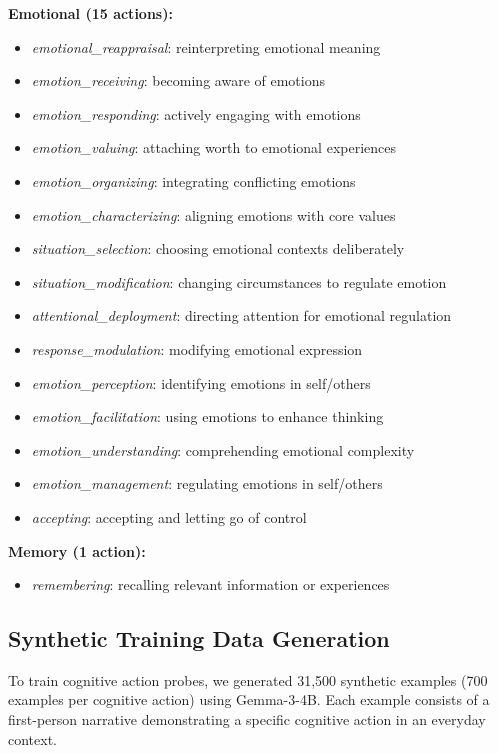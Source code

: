 \documentclass{article}
\begin{document}
\textbf{Emotional (15 actions):}
\begin{itemize}
    \item \textit{emotional\_reappraisal}: reinterpreting emotional meaning
    \item \textit{emotion\_receiving}: becoming aware of emotions
    \item \textit{emotion\_responding}: actively engaging with emotions
    \item \textit{emotion\_valuing}: attaching worth to emotional experiences
    \item \textit{emotion\_organizing}: integrating conflicting emotions
    \item \textit{emotion\_characterizing}: aligning emotions with core values
    \item \textit{situation\_selection}: choosing emotional contexts deliberately
    \item \textit{situation\_modification}: changing circumstances to regulate emotion
    \item \textit{attentional\_deployment}: directing attention for emotional regulation
    \item \textit{response\_modulation}: modifying emotional expression
    \item \textit{emotion\_perception}: identifying emotions in self/others
    \item \textit{emotion\_facilitation}: using emotions to enhance thinking
    \item \textit{emotion\_understanding}: comprehending emotional complexity
    \item \textit{emotion\_management}: regulating emotions in self/others
    \item \textit{accepting}: accepting and letting go of control
\end{itemize}

\textbf{Memory (1 action):}
\begin{itemize}
    \item \textit{remembering}: recalling relevant information or experiences
\end{itemize}

\subsection{Synthetic Training Data Generation}

To train cognitive action probes, we generated 31,500 synthetic examples (700 examples per cognitive action) using Gemma-3-4B. Each example consists of a first-person narrative demonstrating a specific cognitive action in an everyday context.
\end{document}
